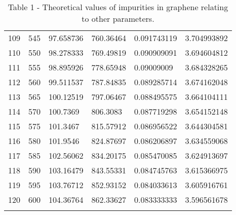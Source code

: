 \documentclass[../Matt_Gebert_Honours_Thesis.tex]{subfiles}
\begin{document}
\begin{longtable}[c]{l|lllll}
	109 & 545                     & 97.658736               & 760.36464 & 0.091743119             & 3.704993892            \\
	110 & 550                     & 98.278333               & 769.49819 & 0.090909091             & 3.694604812            \\
	111 & 555                     & 98.895926               & 778.65948 & 0.09009009              & 3.684328265            \\
	112 & 560                     & 99.511537               & 787.84835 & 0.089285714             & 3.674162048            \\
	113 & 565                     & 100.12519               & 797.06467 & 0.088495575             & 3.664104111            \\
	114 & 570                     & 100.7369                & 806.3083  & 0.087719298             & 3.654152148            \\
	115 & 575                     & 101.3467                & 815.57912 & 0.086956522             & 3.644304581            \\
	116 & 580                     & 101.9546                & 824.87697 & 0.086206897             & 3.634559068            \\
	117 & 585                     & 102.56062               & 834.20175 & 0.085470085             & 3.624913697            \\
	118 & 590                     & 103.16479               & 843.55331 & 0.084745763             & 3.615366975            \\
	119 & 595                     & 103.76712               & 852.93152 & 0.084033613             & 3.605916761            \\
	120 & 600                     & 104.36764               & 862.33627 & 0.083333333             & 3.596561678\\
	\caption{Table 1 - Theoretical values of impurities in graphene relating to other parameters.}
	\label{tbl:theory_transport}
\end{longtable}
\end{document}
